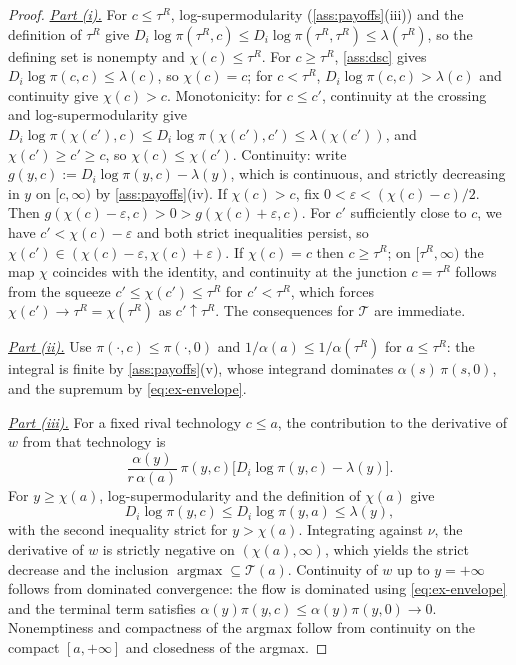 \documentclass[12pt,reqno]{article}
\newcommand{\e}{\varepsilon}
\theoremstyle{definition} \newtheorem{example}{Example}
\theoremstyle{definition} \newtheorem{condition}{Condition}
\theoremstyle{definition} \newtheorem{corollary}{Corollary}
\theoremstyle{definition} \newtheorem{claim}{Claim}
\theoremstyle{definition} \newtheorem{definition}{Definition}
\theoremstyle{definition} \newtheorem{conjecture}{Conjecture}
\theoremstyle{definition} \newtheorem{Lemma}{Lemma}
\theoremstyle{definition} \newtheorem{lemma}{Lemma}
\theoremstyle{plain} \newtheorem{theorem}{Theorem}
\theoremstyle{definition} \newtheorem{assumption}{Assumption}
\theoremstyle{definition} \newtheorem*{assumptionnonumber}{Assumption}
\theoremstyle{definition} \newtheorem*{theoremNoNumber}{Proposition}
\theoremstyle{definition}
\theoremstyle{definition}\newtheorem{proposition}{Proposition}
\theoremstyle{definition} \newtheorem{result}{Result}
\theoremstyle{definition} \newtheorem*{definitionNoNumber}{Definition}
\theoremstyle{definition} \newtheorem{Definition}{Definition}
\theoremstyle{definition} \newtheorem*{DefinitionNoNumber}{Definition}
\theoremstyle{definition} \newtheorem*{fact}{Fact}
\theoremstyle{definition} \newtheorem*{property}{Property}
\DeclareMathOperator*{\argmax}{argmax}
\theoremstyle{definition} \newtheorem{remark}{Remark}
\begin{document}
\begin{proof} 
\noindent \underline{\emph{Part (i).}} For $c\le\tau^R$, log-supermodularity (\cref{ass:payoffs}(iii)) and the definition of $\tau^R$ give $D_i\log\pi(\tau^R,c)\le D_i\log\pi(\tau^R,\tau^R)\le\lambda(\tau^R)$, so the defining set is nonempty and $\chi(c)\le\tau^R$. For $c\ge\tau^R$, \cref{ass:dsc} gives $D_i\log\pi(c,c)\le\lambda(c)$, so $\chi(c)=c$; for $c<\tau^R$, $D_i\log\pi(c,c)>\lambda(c)$ and continuity give $\chi(c)>c$. Monotonicity: for $c\le c'$, continuity at the crossing and log-supermodularity give $D_i\log\pi(\chi(c'),c)\le D_i\log\pi(\chi(c'),c')\le\lambda(\chi(c'))$, and $\chi(c')\ge c'\ge c$, so $\chi(c)\le\chi(c')$. Continuity: write $g(y,c):=D_i\log\pi(y,c)-\lambda(y)$, which is continuous, and strictly decreasing in $y$ on $[c,\infty)$ by \cref{ass:payoffs}(iv). If $\chi(c)>c$, fix $0<\e<(\chi(c)-c)/2$. Then $g(\chi(c)-\e,c)>0>g(\chi(c)+\e,c)$. For $c'$ sufficiently close to $c$, we have $c'<\chi(c)-\e$ and both strict inequalities persist, so $\chi(c')\in(\chi(c)-\e,\chi(c)+\e)$. If $\chi(c)=c$ then $c\ge\tau^R$; on $[\tau^R,\infty)$ the map $\chi$ coincides with the identity, and continuity at the junction $c=\tau^R$ follows from the squeeze $c'\le\chi(c')\le\tau^R$ for $c'<\tau^R$, which forces $\chi(c')\to\tau^R=\chi(\tau^R)$ as $c'\uparrow\tau^R$. The consequences for $\mathcal{T}$ are immediate.

\noindent \underline{\emph{Part (ii).}} Use $\pi(\cdot,c)\le\pi(\cdot,0)$ and $1/\alpha(a)\le1/\alpha(\tau^R)$ for $a\le\tau^R$: the integral is finite by \cref{ass:payoffs}(v), whose integrand dominates $\alpha(s)\,\pi(s,0)$, and the supremum by \eqref{eq:ex-envelope}.

\noindent \underline{\emph{Part (iii).}} For a fixed rival technology $c\le a$, the contribution to the derivative of $w$ from that technology is
\[
\frac{\alpha(y)}{r\,\alpha(a)}\,\pi(y,c)\Big[D_i\log\pi(y,c)-\lambda(y)\Big].
\]
For $y\ge\chi(a)$, log-supermodularity and the definition of $\chi(a)$ give
\[
D_i\log\pi(y,c)\le D_i\log\pi(y,a)\le\lambda(y),
\]
with the second inequality strict for $y>\chi(a)$. Integrating against $\nu$, the derivative of $w$ is strictly negative on $(\chi(a),\infty)$, which yields the strict decrease and the inclusion $\argmax\subseteq\mathcal{T}(a)$. Continuity of $w$ up to $y=+\infty$ follows from dominated convergence: the flow is dominated using \eqref{eq:ex-envelope} and the terminal term satisfies $\alpha(y)\pi(y,c)\le \alpha(y)\pi(y,0)\to0$. Nonemptiness and compactness of the argmax follow from continuity on the compact $[a,+\infty]$ and closedness of the argmax.


\end{proof}
\end{document}
